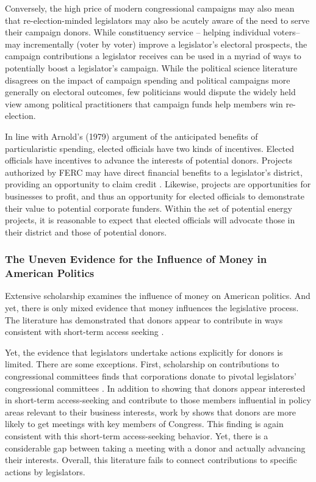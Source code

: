 \documentclass{article}
\begin{document}
Conversely, the high price of modern congressional campaigns may also mean that re-election-minded legislators may also be acutely aware of the need to serve their campaign donors. While constituency service -- helping individual voters-- may incrementally (voter by voter) improve a legislator's electoral prospects, the campaign contributions a legislator receives can be used in a myriad of ways to potentially boost a legislator's campaign.  While the political science literature disagrees on the impact of campaign spending and political campaigns more generally on electoral outcomes, few politicians would dispute the widely held view among political practitioners that campaign funds help members win re-election. 

In line with Arnold's (1979) argument of the anticipated benefits of particularistic spending, elected officials have two kinds of incentives.  Elected officials have incentives to advance the interests of potential donors. Projects authorized by FERC may have direct financial benefits to a legislator's district, providing an opportunity to claim credit \citep{Arnold1979, GriWesMes14}. Likewise, projects are opportunities for businesses to profit, and thus an opportunity for elected officials to demonstrate their value to potential corporate funders. Within the set of potential energy projects, it is reasonable to expect that elected officials will advocate those in their district and those of potential donors.

\subsubsection{The Uneven Evidence for the Influence of Money in American Politics}

Extensive scholarship examines the influence of money on American politics. And yet, there is only mixed evidence that money influences the legislative process. The literature has demonstrated that donors appear to contribute in ways consistent with short-term access seeking \citep{Snyder1992, RomerSnyder1994, PowellGrimmer2016, Barber2016, FouirnaiesHall2018}.  

Yet, the evidence that legislators undertake actions explicitly for donors is limited.  There are some exceptions. First, scholarship on contributions to congressional committees finds that corporations donate to pivotal legislators' congressional committees \citep{PowellGrimmer2016, BerryFowler2016}. 
In addition to showing that donors appear interested in short-term access-seeking and contribute to those members influential in policy areas relevant to their business interests, work by \citet{KallaBroockman2016} shows that donors are more likely to get meetings with key members of Congress.  This finding is again consistent with this short-term access-seeking behavior. Yet, there is a considerable gap between taking a meeting with a donor and actually advancing their interests. Overall, this literature fails to connect contributions to specific actions by legislators. 
\end{document}
